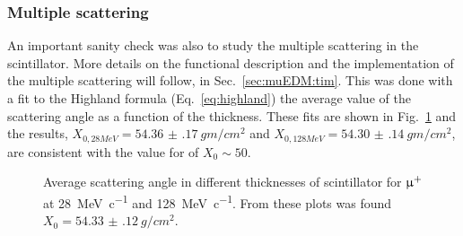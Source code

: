 \begin{refsection}
        \subsubsection{Multiple scattering}
            An important sanity check was also to study the multiple scattering in the scintillator. 
            More details on the functional description and the \gf implementation of the multiple scattering will follow, in Sec.~\ref{sec:muEDM:tim}.
            This was done with a fit to the Highland formula (Eq.~\ref{eq:highland}) the average value of the scattering angle as a function of the thickness. 
            These fits are shown in Fig.~\ref{fig:muEDM:entrance:ms} and the results, $X_{0, 28MeV} = \SI{54.36(17)}{gm/cm^2}$ and $X_{0, 128MeV} = \SI{54.30(14)}{gm/cm^2}$, are consistent with the value for  of $X_{0}\sim 50$.


            \begin{figure}   
                \centering
                \hfill
                \caption[muEDM \gf: scattering angle in scintillators]{Average scattering angle in different thicknesses of  scintillator for $\upmu^+$ at \SI{28}{MeV\per c} and \SI{128}{MeV\per c}. From these plots was found $X_0 = \SI{54.33(12)}{g/cm^2}$.}
                \label{fig:muEDM:entrance:ms}
            \end{figure}


\end{refsection}
